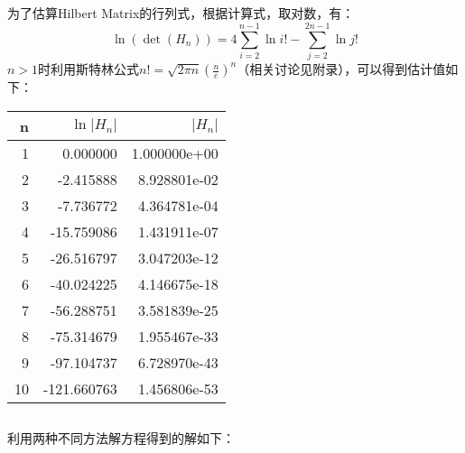 \documentclass{ctexart}
\begin{document}
    \subsection{}
    为了估算Hilbert Matrix的行列式，根据计算式，取对数，有：
    $$\ln{(\det{(H_n)})}=4\sum_{i=2}^{n-1}{\ln{i!}}-\sum_{j=2}^{2n-1}{\ln{j!}}$$
    $n>1$时利用斯特林公式$n!=\sqrt{2\pi n}{(\frac{n}{e})^n}$（相关讨论见附录），可以得到估计值如下：
    \begin{table}[htbp]
        \centering
        \begin{tabular}{rrr}
            \toprule
             n &     $\ln{|H_n|}$ &           $|H_n|$ \\
            \midrule
            1 &    0.000000 &  1.000000e+00 \\
            2 &   -2.415888 &  8.928801e-02 \\
            3 &   -7.736772 &  4.364781e-04 \\
            4 &  -15.759086 &  1.431911e-07 \\
            5 &  -26.516797 &  3.047203e-12 \\
            6 &  -40.024225 &  4.146675e-18 \\
            7 &  -56.288751 &  3.581839e-25 \\
            8 &  -75.314679 &  1.955467e-33 \\
            9 &  -97.104737 &  6.728970e-43 \\
            10 & -121.660763 &  1.456806e-53 \\
            \bottomrule
            \end{tabular}
    \end{table}
    \subsection{}
    利用两种不同方法解方程得到的解如下：
\end{document}
